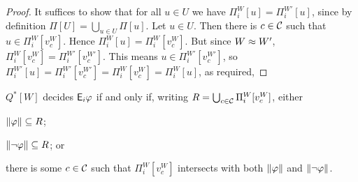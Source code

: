\begin{proof}
    It suffices to show that for all $u \in U$ we have $\Pi^W_i[u] =
    \Pi^{W'}_i[u]$, since by definition $\Pi[U] = \bigcup_{u \in U}{\Pi[u]}$.
    Let $u \in U$. Then there is $c \in \mathcal{C}$ such that $u \in \Pi^W_i[v^W_c]$.
    Hence $\Pi^W_i[u] = \Pi^W_i[v^W_c]$. But since $W \approx W'$,
    $\Pi^W_i[v^W_c] = \Pi^{W'}_i[v^{W'}_c]$. This means $u \in
    \Pi^{W'}_i[v^{W'}_c]$, so $\Pi^{W'}_i[u] = \Pi^{W'}_i[v^{W'}_c] =
    \Pi^W_i[v^W_c] = \Pi^W_i[u]$, as required,
\end{proof}

\begin{lemma}
    \label{lemma_decide_ephi}
    $Q^*[W]$ decides $\mathsf{E}_i\varphi$ if and only if, writing $R = \bigcup_{c \in
    \mathcal{C}}{\Pi^W_i[v^W_c]}$, either
    \begin{inlinelist}
        \item\label{item_phi_sub_r} $\|{\varphi}\| \subseteq R$;
        \item\label{item_negphi_sub_r} $\|{\neg\varphi}\| \subseteq R$; or
        \item\label{item_r_boundary} there is some $c \in \mathcal{C}$ such that
            $\Pi^W_i[v^W_c]$ intersects with both $\|{\varphi}\|$ and
            $\|{\neg\varphi}\|$.
    \end{inlinelist}
\end{lemma}

